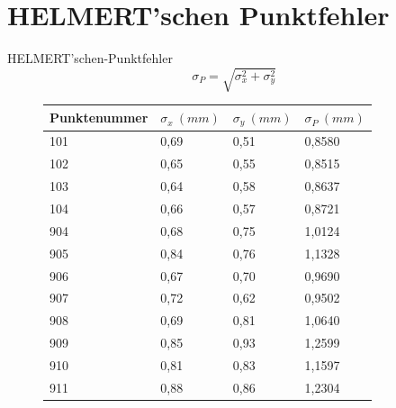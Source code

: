 \documentclass[12pt]{article}
\begin{document}
\section{HELMERT'schen Punktfehler}
HELMERT'schen-Punktfehler \newline
\begin{equation*}
\sigma_{P}=\sqrt{\sigma_{x}^2 + \sigma_{y}^2}
\end{equation*}
\begin{figure}[ht] \centering
\begin{tabular}{llll}
	\hline
	\multicolumn{1}{|l|}{Punktenummer} & \multicolumn{1}{l|}{$\sigma_x \ (mm)$}    & \multicolumn{1}{l|}{$\sigma_y \ (mm)$}    & \multicolumn{1}{l|}{$\sigma_P \ (mm)$}      \\ \hline
	\multicolumn{1}{|l|}{101}          & \multicolumn{1}{l|}{0,69} & \multicolumn{1}{l|}{0,51} & \multicolumn{1}{l|}{0,8580} \\ \hline
	\multicolumn{1}{|l|}{102}          & \multicolumn{1}{l|}{0,65} & \multicolumn{1}{l|}{0,55} & \multicolumn{1}{l|}{0,8515} \\ \hline
	\multicolumn{1}{|l|}{103}          & \multicolumn{1}{l|}{0,64} & \multicolumn{1}{l|}{0,58} & \multicolumn{1}{l|}{0,8637} \\ \hline
	\multicolumn{1}{|l|}{104}          & \multicolumn{1}{l|}{0,66} & \multicolumn{1}{l|}{0,57} & \multicolumn{1}{l|}{0,8721} \\ \hline
	\multicolumn{1}{|l|}{904}          & \multicolumn{1}{l|}{0,68} & \multicolumn{1}{l|}{0,75} & \multicolumn{1}{l|}{1,0124} \\ \hline
	\multicolumn{1}{|l|}{905}          & \multicolumn{1}{l|}{0,84} & \multicolumn{1}{l|}{0,76} & \multicolumn{1}{l|}{1,1328} \\ \hline
	\multicolumn{1}{|l|}{906}          & \multicolumn{1}{l|}{0,67} & \multicolumn{1}{l|}{0,70} & \multicolumn{1}{l|}{0,9690} \\ \hline
	\multicolumn{1}{|l|}{907}          & \multicolumn{1}{l|}{0,72} & \multicolumn{1}{l|}{0,62} & \multicolumn{1}{l|}{0,9502} \\ \hline
	\multicolumn{1}{|l|}{908}          & \multicolumn{1}{l|}{0,69} & \multicolumn{1}{l|}{0,81} & \multicolumn{1}{l|}{1,0640} \\ \hline
	\multicolumn{1}{|l|}{909}          & \multicolumn{1}{l|}{0,85} & \multicolumn{1}{l|}{0,93} & \multicolumn{1}{l|}{1,2599} \\ \hline
	\multicolumn{1}{|l|}{910}          & \multicolumn{1}{l|}{0,81} & \multicolumn{1}{l|}{0,83} & \multicolumn{1}{l|}{1,1597} \\ \hline
	\multicolumn{1}{|l|}{911}          & \multicolumn{1}{l|}{0,88} & \multicolumn{1}{l|}{0,86} & \multicolumn{1}{l|}{1,2304} \\ \hline
\end{tabular}
\end{figure}
\end{document}

